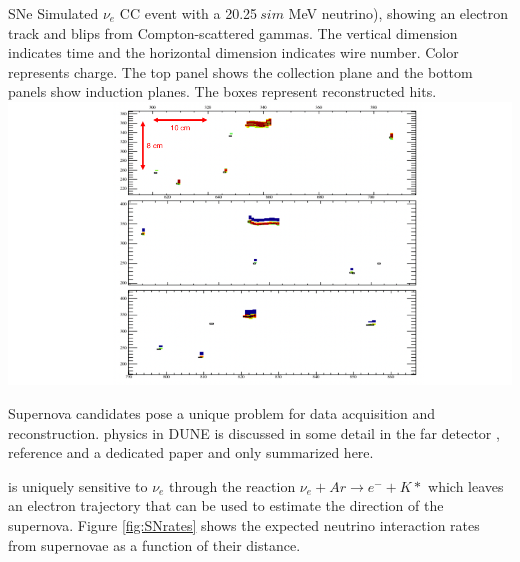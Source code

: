 \documentclass[../main-v1.tex]{subfiles}
\begin{document}
\begin{dunefigure}
{SNe} %
{
 Simulated $\nu_e$
 CC event with a 20.25$~sim$ MeV neutrino), showing an electron track and blips from Compton-scattered gammas. The vertical dimension indicates time and the horizontal dimension indicates wire number. Color represents charge. The top panel shows the collection plane and the bottom panels show induction planes. The boxes represent reconstructed hits. }
\includegraphics[width=\textwidth]{graphics/IntroFigures/nueCC_20-25MeV_event25_2.png} %
\end{dunefigure}



Supernova candidates pose a unique problem for data acquisition and reconstruction.   physics in DUNE is discussed in some detail in the far detector \cite{ Abi:2020evt}, reference \cite{Cuesta:2020dy} and a dedicated paper \cite{DUNE:2020zfm} and only summarized here. 

 is uniquely sensitive to $\nu_e$ through the reaction $\nu_e + Ar \rightarrow e^- + K*$ which leaves an electron trajectory that can be used to estimate the direction of the supernova.  Figure \ref{fig:SNrates} shows the expected neutrino interaction rates from supernovae as a function of their distance.
\end{document}
